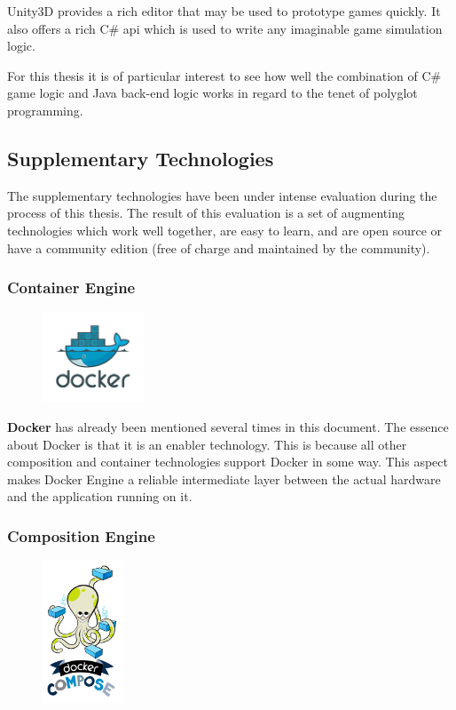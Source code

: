 Unity3D provides a rich editor that may be used to prototype games quickly. It
also offers a rich C\# \gls{api} which is used to write any imaginable game
simulation logic.

For this thesis it is of particular interest to see how well the combination of
C\# game logic and Java back-end logic works in regard to the \ms{} tenet of
polyglot programming.
    
\subsection{Supplementary Technologies}

The supplementary technologies have been under intense evaluation during the
process of this thesis. The result of this evaluation is a set of augmenting
technologies which work well together, are easy to learn, and are open source or
have a community edition (free of charge and maintained by the community).

\subsubsection{Container Engine}

\begin{figure}
	\vspace*{-0.5cm} \hspace*{0.2cm}
    \includegraphics[width=3cm]{images/dependencies/docker}
\end{figure}

\textbf{Docker} has already been mentioned several times in this document.
The essence about Docker is that it is an enabler technology. This is because
all other composition and container technologies support Docker in some way.
This aspect makes Docker Engine a reliable intermediate layer between the actual
hardware and the application running on it.

\newpage
\subsubsection{Composition Engine}

\begin{figure}
	\vspace*{-0.5cm} \hspace*{0.8cm}
    \includegraphics[width=2.4cm]{images/dependencies/docker-compose}
\end{figure}

